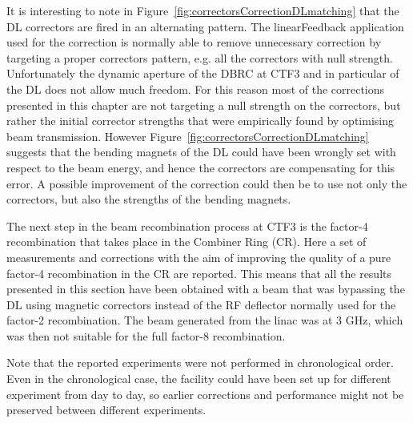 It is interesting to note in
Figure~\ref{fig:correctorsCorrectionDLmatching}
that the DL correctors are fired in an alternating pattern.
The linearFeedback application used for the correction is normally able to remove
unnecessary correction by targeting a proper correctors pattern, 
e.g. all the correctors with null strength.
Unfortunately the dynamic aperture of the DBRC at CTF3 and in particular of the DL does not
allow much freedom.
For this reason most of the corrections presented in this chapter are not targeting a null
strength on the correctors, but rather the initial corrector strengths that were
empirically found by optimising beam transmission.
However
Figure~\ref{fig:correctorsCorrectionDLmatching}
suggests that the bending magnets of the DL could have been wrongly set with respect to the
beam energy, and hence the correctors are compensating for this error.
A possible improvement of the correction could then be to use not only the correctors, but
also the strengths of the bending magnets. %



The next step in the beam recombination process at CTF3 is the factor-4 recombination that 
takes place in the Combiner Ring (CR).
Here a set of measurements and corrections with the aim of improving the quality of 
a pure factor-4 recombination in the CR are reported.
This means that all the results presented in this section have been obtained with 
a beam that was bypassing the DL using magnetic correctors instead of the RF deflector 
normally used for the factor-2 recombination.
The beam generated from the linac was at 3 GHz, which was then not suitable for 
the full factor-8 recombination.

Note that the reported experiments were not performed in chronological order.
Even in the chronological case, the facility could have been set up for different experiment 
from day to day, so earlier corrections and performance might not be preserved 
between different experiments. 


